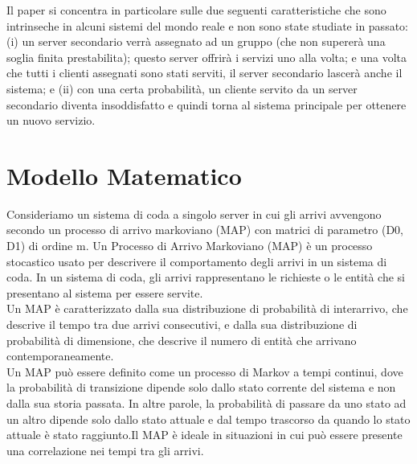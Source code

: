 \documentclass[11pt]{article}
\begin{document}
\noindent Il paper si concentra in particolare sulle due seguenti caratteristiche che sono intrinseche in alcuni sistemi del mondo reale e non sono state studiate in passato: (i) un server secondario verrà assegnato ad un gruppo (che non supererà una soglia finita prestabilita); questo server offrirà i servizi uno alla volta; e una volta che tutti i clienti assegnati sono stati serviti, il server secondario lascerà anche il sistema; e (ii) con una certa probabilità, un cliente servito da un server secondario diventa insoddisfatto e quindi torna al sistema principale per ottenere un nuovo servizio.

\clearpage

\section{Modello Matematico}


Consideriamo un sistema di coda a singolo server in cui gli arrivi avvengono secondo un processo di arrivo markoviano (MAP) con matrici di parametro (D0, D1) di ordine m. Un Processo di Arrivo Markoviano (MAP) è un processo stocastico usato per descrivere il comportamento degli arrivi in un sistema di coda. In un sistema di coda, gli arrivi rappresentano le richieste o le entità che si presentano al sistema per essere servite. \\

\noindent Un MAP è caratterizzato dalla sua distribuzione di probabilità di interarrivo, che descrive il tempo tra due arrivi consecutivi, e dalla sua distribuzione di probabilità di dimensione, che descrive il numero di entità che arrivano contemporaneamente. \\

\noindent Un MAP può essere definito come un processo di Markov a tempi continui, dove la probabilità di transizione dipende solo dallo stato corrente del sistema e non dalla sua storia passata. In altre parole, la probabilità di passare da uno stato ad un altro dipende solo dallo stato attuale e dal tempo trascorso da quando lo stato attuale è stato raggiunto.Il MAP è ideale in situazioni in cui può essere presente una correlazione nei tempi tra gli arrivi.
\end{document}
